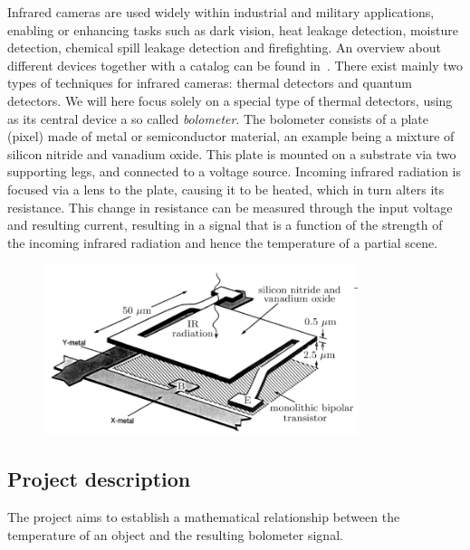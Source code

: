 Infrared cameras are used widely within industrial and military
applications, enabling or enhancing tasks such as dark vision, heat
leakage detection, moisture detection, chemical spill leakage
detection and firefighting. An overview about different devices
together with a catalog can be found in~\cite{flir_handbook}. There
exist mainly two types of techniques for infrared cameras: thermal
detectors and quantum detectors. We will here focus solely on a
special type of thermal detectors, using as its central device a so
called \textit{bolometer}. The bolometer consists of a plate (pixel)
made of metal or semiconductor material, an example being a mixture of
silicon nitride and vanadium oxide. This plate is mounted on a
substrate via two supporting legs, and connected to a voltage
source. Incoming infrared radiation is focused via a lens to the
plate, causing it to be heated, which in turn alters its
resistance. This change in resistance can be measured through the
input voltage and resulting current, resulting in a signal that is a
function of the strength of the incoming infrared radiation and hence
the temperature of a partial scene.

\begin{figure}[h]
\begin{center}
\includegraphics[height=5cm]{gfx/pixel1.png}
\caption{  }
\end{center}
\end{figure}

\subsection{Project description}
The project aims to establish a mathematical relationship between the temperature of an object and the resulting bolometer signal.


